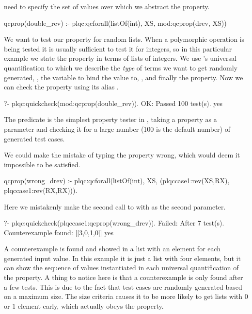 need to specify the set of values over which we abstract the property.
%
\begin{yapcode}
 qcprop(double_rev) :-
   plqc:qcforall(listOf(int), XS,
                 mod:qcprop({drev, XS}))
\end{yapcode}
%
We want to test our  property for random  lists.
%
When a polymorphic operation is being tested it is usually sufficient
to test it for integers, so in this particular example
we state the property in terms of lists of integers.
%
We use \plqc{}'s universal quantification to which we describe the
\emph{type} of terms we want to get randomly generated,
, the variable to bind the value to, ,
and finally the property.
%
Now we can check the property using its alias .
\begin{yapcode}
   ?- plqc:quickcheck(mod:qcprop(double_rev)).
 OK: Passed 100 test(s).
 yes
\end{yapcode}
%
The  predicate is the simplest property tester in
\plqc{}, taking a property as a parameter and checking it for a large
number (100 is the default number) of generated test cases.


We could make the mistake of typing the property wrong, which would deem
it impossible to be satisfied.
%
\begin{yapcode}
 qcprop(wrong_drev) :-
   plqc:qcforall(listOf(int), XS,
                 (plqccase1:rev(XS,RX),
                  plqccase1:rev(RX,RX))).
\end{yapcode}
%
Here we mistakenly make the second call to  with  as
the second parameter.
%
\begin{yapcode}
   ?- plqc:quickcheck(plqccase1:qcprop(wrong_drev)).
 Failed: After 7 test(s).
 Counterexample found: [[3,0,1,0]] 
 yes
\end{yapcode}
A counterexample is found and showed in a list with an element for each
generated input value.
%
In this example it is just a list with four elements, but it can show
the sequence of values instantiated in each universal quantification of
the property.
%
A thing to notice here is that a counterexample is only found after a
few tests.
%
This is due to the fact that test cases are randomly generated based on
a maximum size.
%
The size criteria causes it to be more likely to get lists with 0 or 1
element early, which actually obeys the property.


